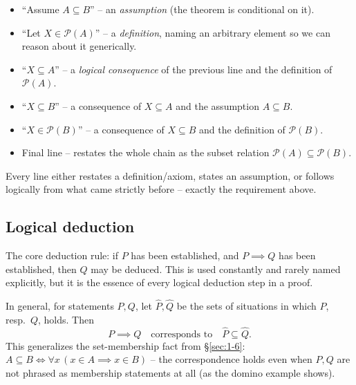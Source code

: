 \documentclass[11pt]{article}
\begin{document}
\begin{note}
\begin{itemize}
    \item ``Assume $A\subseteq B$'' -- an \emph{assumption} (the theorem is conditional on it).
    \item ``Let $X \in \mathcal{P}(A)$'' -- a \emph{definition}, naming an arbitrary element so we can reason about it generically.
    \item ``$X \subseteq A$'' -- a \emph{logical consequence} of the previous line and the definition of $\mathcal{P}(A)$.
    \item ``$X \subseteq B$'' -- a consequence of $X\subseteq A$ and the assumption $A \subseteq B$.
    \item ``$X \in \mathcal{P}(B)$'' -- a consequence of $X \subseteq B$ and the definition of $\mathcal{P}(B)$.
    \item Final line -- restates the whole chain as the subset relation $\mathcal{P}(A)\subseteq\mathcal{P}(B)$.
\end{itemize}
Every line either restates a definition/axiom, states an assumption, or follows logically from what came strictly before -- exactly the requirement above.
\end{note}

\subsection{Logical deduction}
\label{sec:3-2}

\begin{note}
The core deduction rule: if $P$ has been established, and $P \implies Q$ has been established, then $Q$ may be deduced. This is used constantly and rarely named explicitly, but it is the essence of every logical deduction step in a proof.
\end{note}

\begin{note}
In general, for statements $P,Q$, let $\hat P, \hat Q$ be the sets of situations in which $P$, resp.\ $Q$, holds. Then
\[
P \implies Q \quad \text{corresponds to} \quad \hat P \subseteq \hat Q.
\]
This generalizes the set-membership fact from \S\ref{sec:1-6}: $A \subseteq B \iff \forall x\,(x\in A \implies x \in B)$ -- the correspondence holds even when $P,Q$ are not phrased as membership statements at all (as the domino example shows).
\end{note}
\end{document}
